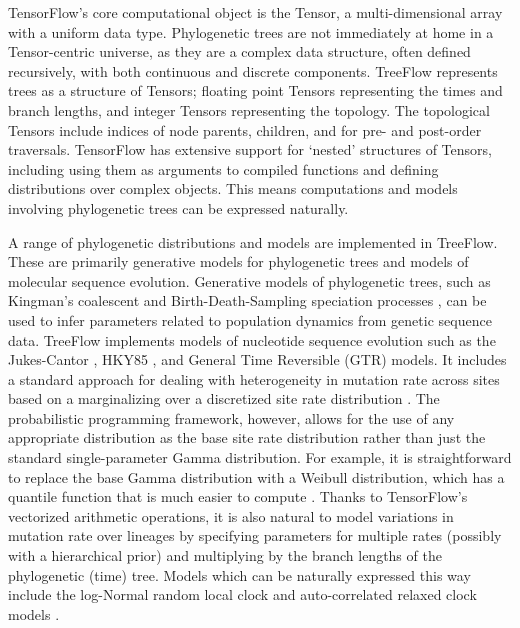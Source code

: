 TensorFlow's core computational object is the Tensor, a multi-dimensional array with a uniform data type. Phylogenetic trees are not immediately at home in a Tensor-centric universe, as they are a complex data structure, often defined recursively, with both continuous and discrete components. TreeFlow represents trees as a structure of Tensors; floating point Tensors representing the times and branch lengths, and integer Tensors representing the topology. The topological Tensors include indices of node parents, children, and for pre- and post-order traversals. TensorFlow has extensive support for `nested' structures of Tensors, including using them as arguments to compiled functions and defining distributions over complex objects. This means computations and models involving phylogenetic trees can be expressed naturally.

A range of phylogenetic distributions and models are implemented in TreeFlow. These are primarily generative models for phylogenetic trees and models of molecular sequence evolution. Generative models of phylogenetic trees, such as Kingman's coalescent \cite{kuhner1995estimating} and Birth-Death-Sampling speciation processes \cite{stadler2009incomplete}, can be used to infer parameters related to population dynamics from genetic sequence data. TreeFlow implements models of nucleotide sequence evolution such as the Jukes-Cantor \cite{jukes1969evolution}, HKY85 \cite{hasegawa1985dating}, and General Time Reversible (GTR) \cite{tavare1986some} models. It includes a standard approach for dealing with heterogeneity in mutation rate across sites based on a marginalizing over a discretized site rate distribution \cite{yang1994maximum}. The probabilistic programming framework, however, allows for the use of any appropriate distribution as the base site rate distribution rather than just the standard single-parameter Gamma distribution. For example, it is straightforward to replace the base Gamma distribution with a Weibull distribution, which has a quantile function that is much easier to compute \cite{fourment2019evaluating}. Thanks to TensorFlow's vectorized arithmetic operations, it is also natural to model variations in mutation rate over lineages by specifying parameters for multiple rates (possibly with a hierarchical prior) and multiplying by the branch lengths of the phylogenetic (time) tree. Models which can be naturally expressed this way include the log-Normal random local clock \cite{drummond2006relaxed} and auto-correlated relaxed clock models \cite{thorne1998estimating}.


